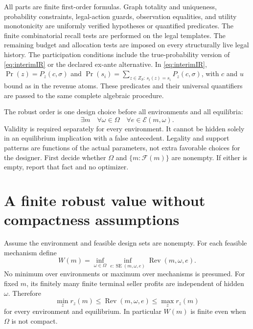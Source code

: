 \documentclass[11pt,a4paper]{article}
\numberwithin{equation}{section}
\theoremstyle{definition}
\newcommand{\cE}{\mathcal E}
\DeclareMathOperator{\SE}{SE}
\DeclareMathOperator{\Rev}{Rev}
\begin{document}
All parts are finite first-order formulas.
Graph totality and uniqueness, probability constraints, legal-action
guards, observation equalities, and utility monotonicity are uniformly
verified hypotheses or quantified predicates.
The finite combinatorial recall tests are performed on the legal
templates. The remaining budget and allocation tests are imposed
on every structurally live legal history.
The participation conditions include the true-probability version of
\eqref{eq:interimIR} or the declared ex-ante alternative.
In \eqref{eq:interimIR}, \(\Pr(z)=P_z(c,\sigma)\) and
\(\Pr(s_i)=\sum_{z\in Z_S:\,s_i(z)=s_i}P_z(c,\sigma)\), with \(c\) and \(u\)
bound as in the revenue atoms.
These predicates and their universal quantifiers are passed to the
same complete algebraic procedure.

The robust order is one design choice before all environments and
all equilibria:
\[
 \exists m\quad\forall\omega\in\Omega\quad
 \forall e\in\cE(m,\omega).
\]
Validity is required separately for every environment.
It cannot be hidden solely in an equilibrium implication with a false
antecedent. Legality and support patterns are functions of the actual
parameters, not extra favorable choices for the designer.
First decide whether \(\Omega\) and \(\{m:\mathcal F(m)\}\) are
nonempty. If either is empty, report that fact and no optimizer.

\section{A finite robust value without compactness assumptions}\label{sec:bounds}
Assume the environment and feasible design sets are nonempty.
For each feasible mechanism define
\[
 W(m)=\inf_{\omega\in\Omega}\inf_{e:\SE(m,\omega,e)}
                       \Rev(m,\omega,e).
\]
No minimum over environments or maximum over mechanisms is presumed.
For fixed \(m\), its finitely many finite terminal seller profits
are independent of hidden \(\omega\). Therefore
\begin{equation}\label{eq:leafbounds}
 \min_z r_z(m)\le\Rev(m,\omega,e)\le\max_z r_z(m)
\end{equation}
for every environment and equilibrium.
In particular \(W(m)\) is finite even when \(\Omega\) is not compact.
\end{document}
